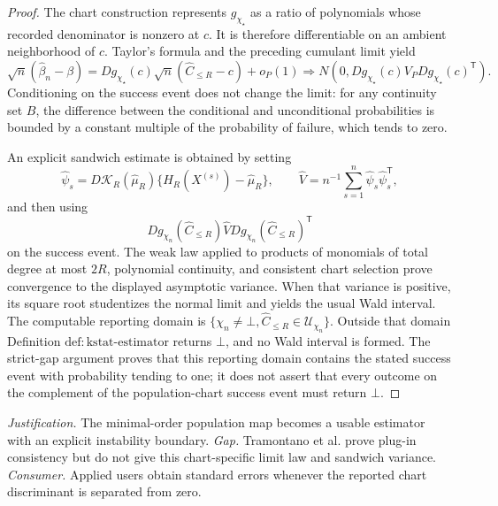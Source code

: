 \documentclass{article}
\begin{document}
\begin{proof}
The chart construction represents \(g_{\chi_\star}\) as a ratio of polynomials whose recorded denominator is nonzero at \(c\).  It is therefore differentiable on an ambient neighborhood of \(c\).  Taylor's formula and the preceding cumulant limit yield
\[
 \sqrt n(\widehat\beta_n-\beta)
 =Dg_{\chi_\star}(c)\sqrt n(\widehat C_{\le R}-c)+o_P(1)
 \Rightarrow
 N\!\left(0,Dg_{\chi_\star}(c)V_PDg_{\chi_\star}(c)^{\mathsf T}\right).
\]
Conditioning on the success event does not change the limit: for any continuity set \(B\), the difference between the conditional and unconditional probabilities is bounded by a constant multiple of the probability of failure, which tends to zero.

An explicit sandwich estimate is obtained by setting
\[
 \widehat\psi_s=D\mathcal K_R(\widehat\mu_R)
 \{H_R(X^{(s)})-\widehat\mu_R\},
 \qquad
 \widehat V=n^{-1}\sum_{s=1}^n\widehat\psi_s\widehat\psi_s^{\mathsf T},
\]
and then using
\[
 Dg_{\chi_n}(\widehat C_{\le R})\widehat V
 Dg_{\chi_n}(\widehat C_{\le R})^{\mathsf T}
\]
on the success event.  The weak law applied to products of monomials of total degree at most \(2R\), polynomial continuity, and consistent chart selection prove convergence to the displayed asymptotic variance.  When that variance is positive, its square root studentizes the normal limit and yields the usual Wald interval.  The computable reporting domain is \(\{\chi_n\ne\bot,\widehat C_{\le R}\in\mathcal U_{\chi_n}\}\).  Outside that domain Definition \(\mathrm{def:kstat\mbox{-}estimator}\) returns \(\bot\), and no Wald interval is formed.  The strict-gap argument proves that this reporting domain contains the stated success event with probability tending to one; it does not assert that every outcome on the complement of the population-chart success event must return \(\bot\).
\end{proof}
\par\smallskip\noindent \textit{Justification.} The minimal-order population map becomes a usable estimator with an explicit instability boundary. \textit{Gap.} Tramontano et al. prove plug-in consistency but do not give this chart-specific limit law and sandwich variance. \textit{Consumer.} Applied users obtain standard errors whenever the reported chart discriminant is separated from zero.
\end{document}
